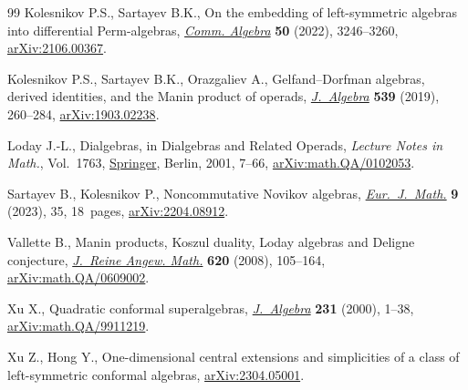 \documentclass[pdftex]{sigma}
\numberwithin{equation}{section}
\begin{document}
\begin{thebibliography}{99}
Kolesnikov P.S., Sartayev B.K., On the embedding of left-symmetric algebras
 into differential {P}erm-algebras, \href{https://doi.org/10.1080/00927872.2022.2028798}{\textit{Comm. Algebra}} \textbf{50} (2022),
 3246--3260, \href{https://arxiv.org/abs/2106.00367}{arXiv:2106.00367}.

Kolesnikov P.S., Sartayev B.K., Orazgaliev A., Gelfand--{D}orfman algebras,
 derived identities, and the {M}anin product of operads, \href{https://doi.org/10.1016/j.jalgebra.2019.07.034}{\textit{J.~Algebra}}
 \textbf{539} (2019), 260--284, \href{https://arxiv.org/abs/1903.02238}{arXiv:1903.02238}.

Loday J.-L., Dialgebras, in Dialgebras and {R}elated {O}perads, \textit{Lecture
 Notes in Math.}, Vol.~1763, \href{https://doi.org/10.1007/3-540-45328-8_2}{Springer}, Berlin, 2001, 7--66,
 \href{https://arxiv.org/abs/math.QA/0102053}{arXiv:math.QA/0102053}.

Sartayev B., Kolesnikov P., Noncommutative {N}ovikov algebras,
 \href{https://doi.org/10.1007/s40879-023-00632-1}{\textit{Eur.~J.~Math.}} \textbf{9} (2023), 35, 18~pages, \href{https://arxiv.org/abs/2204.08912}{arXiv:2204.08912}.

Vallette B., Manin products, {K}oszul duality, {L}oday algebras and {D}eligne
 conjecture, \href{https://doi.org/10.1515/CRELLE.2008.051}{\textit{J.~Reine Angew. Math.}} \textbf{620} (2008), 105--164,
 \href{https://arxiv.org/abs/math.QA/0609002}{arXiv:math.QA/0609002}.

Xu X., Quadratic conformal superalgebras, \href{https://doi.org/10.1006/jabr.1999.8346}{\textit{J.~Algebra}} \textbf{231}
 (2000), 1--38, \href{https://arxiv.org/abs/math.QA/9911219}{arXiv:math.QA/9911219}.

Xu Z., Hong Y., One-dimensional central extensions and simplicities of a class
 of left-symmetric conformal algebras, \href{https://arxiv.org/abs/2304.05001}{arXiv:2304.05001}.

\end{thebibliography}\LastPageEnding
\end{document}
